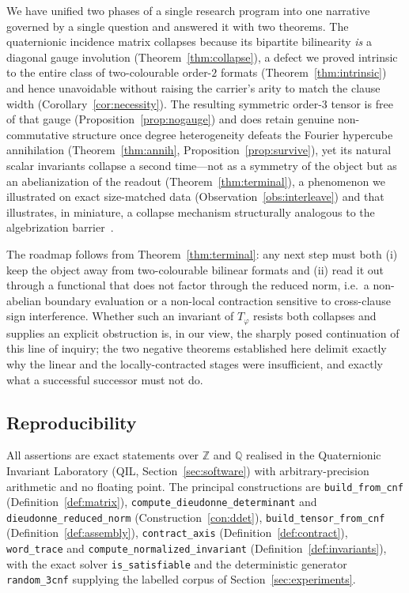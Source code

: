 \documentclass[pdflatex,sn-mathphys-num]{sn-jnl}
\theoremstyle{thmstyleone}%
\theoremstyle{thmstyletwo}%
\theoremstyle{thmstylethree}%
\newcommand{\QQ}{\mathbb{Q}}
\newcommand{\ZZ}{\mathbb{Z}}
\newcommand{\Tphi}{T_{\varphi}}
\begin{document}
We have unified two phases of a single research program into one narrative
governed by a single question and answered it with two theorems. The
quaternionic incidence matrix collapses because its bipartite bilinearity
\emph{is} a diagonal gauge involution (Theorem~\ref{thm:collapse}), a defect
we proved intrinsic to the entire class of two-colourable order-$2$ formats
(Theorem~\ref{thm:intrinsic}) and hence unavoidable without raising the
carrier's arity to match the clause width (Corollary~\ref{cor:necessity}).
The resulting symmetric order-$3$ tensor is free of that gauge
(Proposition~\ref{prop:nogauge}) and does retain genuine non-commutative
structure once degree heterogeneity defeats the Fourier hypercube
annihilation (Theorem~\ref{thm:annih}, Proposition~\ref{prop:survive}), yet
its natural scalar invariants collapse a second time---not as a symmetry of
the object but as an abelianization of the readout
(Theorem~\ref{thm:terminal}), a phenomenon we illustrated on exact
size-matched data (Observation~\ref{obs:interleave}) and that illustrates,
in miniature, a collapse mechanism structurally analogous to the
algebrization barrier~\cite{AW}.

The roadmap follows from Theorem~\ref{thm:terminal}: any next step must both
(i) keep the object away from two-colourable bilinear formats and (ii) read
it out through a functional that does not factor through the reduced norm,
i.e.\ a non-abelian boundary evaluation or a non-local contraction sensitive
to cross-clause sign interference. Whether such an invariant of
$\Tphi$ resists both collapses and supplies an explicit obstruction is, in
our view, the sharply posed continuation of this line of inquiry; the two
negative theorems established here delimit exactly why the linear and the
locally-contracted stages were insufficient, and exactly what a successful
successor must not do.

\subsection*{Reproducibility}

\begin{sloppypar}
All assertions are exact statements over $\ZZ$ and $\QQ$ realised in the
Quaternionic Invariant Laboratory (QIL, Section~\ref{sec:software}) with
arbitrary-precision arithmetic and no floating point.
The principal constructions are \texttt{build\_from\_cnf}
(Definition~\ref{def:matrix}), \texttt{compute\_dieudonne\_determinant} and
\texttt{dieudonne\_reduced\_norm} (Construction~\ref{con:ddet}),
\texttt{build\_tensor\_from\_cnf} (Definition~\ref{def:assembly}),
\texttt{contract\_axis} (Definition~\ref{def:contract}),
\texttt{word\_trace} and \texttt{compute\_normalized\_invariant}
(Definition~\ref{def:invariants}), with the exact solver
\texttt{is\_satisfiable} and the deterministic generator
\texttt{random\_3cnf} supplying the labelled corpus of
Section~\ref{sec:experiments}.
\end{sloppypar}

\newpage

\end{document}
